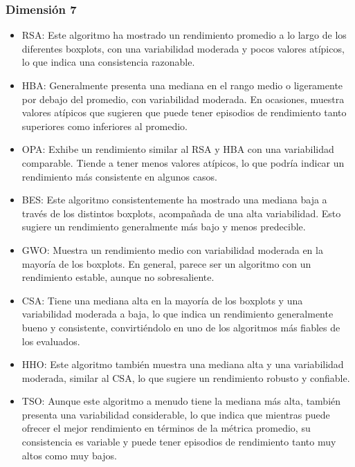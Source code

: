 \documentclass[conference]{IEEEtran}
\begin{document}
\subsubsection{Dimensión 7}
\begin{itemize}
\item RSA: Este algoritmo ha mostrado un rendimiento promedio a lo largo de los diferentes boxplots, con una variabilidad moderada y pocos valores atípicos, lo que indica una consistencia razonable.
	
\item HBA: Generalmente presenta una mediana en el rango medio o ligeramente por debajo del promedio, con variabilidad moderada. En ocasiones, muestra valores atípicos que sugieren que puede tener episodios de rendimiento tanto superiores como inferiores al promedio.
	
\item OPA: Exhibe un rendimiento similar al RSA y HBA con una variabilidad comparable. Tiende a tener menos valores atípicos, lo que podría indicar un rendimiento más consistente en algunos casos.
	
\item BES: Este algoritmo consistentemente ha mostrado una mediana baja a través de los distintos boxplots, acompañada de una alta variabilidad. Esto sugiere un rendimiento generalmente más bajo y menos predecible.
	
\item GWO: Muestra un rendimiento medio con variabilidad moderada en la mayoría de los boxplots. En general, parece ser un algoritmo con un rendimiento estable, aunque no sobresaliente.
	
\item CSA: Tiene una mediana alta en la mayoría de los boxplots y una variabilidad moderada a baja, lo que indica un rendimiento generalmente bueno y consistente, convirtiéndolo en uno de los algoritmos más fiables de los evaluados.

\item HHO: Este algoritmo también muestra una mediana alta y una variabilidad moderada, similar al CSA, lo que sugiere un rendimiento robusto y confiable.
	
\item TSO: Aunque este algoritmo a menudo tiene la mediana más alta, también presenta una variabilidad considerable, lo que indica que mientras puede ofrecer el mejor rendimiento en términos de la métrica promedio, su consistencia es variable y puede tener episodios de rendimiento tanto muy altos como muy bajos.
	
\end{itemize}
\end{document}

